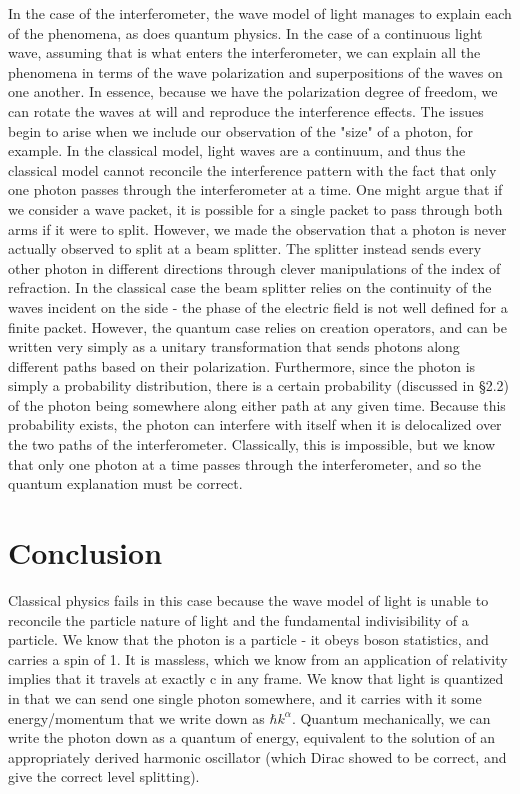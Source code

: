 \documentclass{article}
\begin{document}
In the case of the interferometer, the wave model of light manages to explain each of the phenomena, as does quantum physics.  In the case of a continuous light wave, assuming that is what enters the interferometer, we can explain all the phenomena in terms of the wave polarization and superpositions of the waves on one another.  In essence, because we have the polarization degree of freedom, we can rotate the waves at will and reproduce the interference effects.  The issues begin to arise when we include our observation of the "size" of a photon, for example.  In the classical model, light waves are a continuum, and thus the classical model cannot reconcile the interference pattern with the fact that only one photon passes through the interferometer at a time.  One might argue that if we consider a wave packet, it is possible for a single packet to pass through both arms if it were to split.  However, we made the observation that a photon is never actually observed to split at a beam splitter.  The splitter instead sends every other photon in different directions through clever manipulations of the index of refraction.  In the classical case the beam splitter relies on the continuity of the waves incident on the side - the phase of the electric field is not well defined for a finite packet.  However, the quantum case relies on creation operators, and can be written very simply as a unitary transformation that sends photons along different paths based on their polarization.  Furthermore, since the photon is simply a probability distribution, there is a certain probability (discussed in \S 2.2) of the photon being somewhere along either path at any given time.  Because this probability exists, the photon can interfere with itself when it is delocalized over the two paths of the interferometer.  Classically, this is impossible, but we know that only one photon at a time passes through the interferometer, and so the quantum explanation must be correct.

\section{Conclusion}

Classical physics fails in this case because the wave model of light is unable to reconcile the particle nature of light and the fundamental indivisibility of a particle.  We know that the photon is a particle - it obeys boson statistics, and carries a spin of 1.  It is massless, which we know from an application of relativity implies that it travels at exactly c in any frame.  We know that light is quantized in that we can send one single photon somewhere, and it carries with it some energy/momentum that we write down as $\hbar k^{\alpha}$.  Quantum mechanically, we can write the photon down as a quantum of energy, equivalent to the solution of an appropriately derived harmonic oscillator (which Dirac showed to be correct, and give the correct level splitting).
\end{document}
